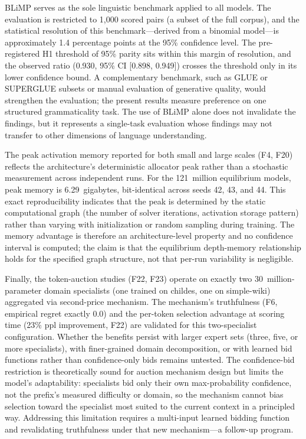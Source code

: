 BLiMP serves as the sole linguistic benchmark applied to all models. The evaluation is restricted to 1,000 scored pairs (a subset of the full corpus), and the statistical resolution of this benchmark—derived from a binomial model—is approximately 1.4 percentage points at the 95\% confidence level. The pre-registered H1 threshold of 95\% parity sits within this margin of resolution, and the observed ratio (0.930, 95\% CI [0.898, 0.949]) crosses the threshold only in its lower confidence bound. A complementary benchmark, such as GLUE or SUPERGLUE subsets or manual evaluation of generative quality, would strengthen the evaluation; the present results measure preference on one structured grammaticality task. The use of BLiMP alone does not invalidate the findings, but it represents a single-task evaluation whose findings may not transfer to other dimensions of language understanding.

The peak activation memory reported for both small and large scales (F4, F20) reflects the architecture's deterministic allocator peak rather than a stochastic measurement across independent runs. For the 121~million equilibrium models, peak memory is 6.29~gigabytes, bit-identical across seeds 42, 43, and 44. This exact reproducibility indicates that the peak is determined by the static computational graph (the number of solver iterations, activation storage pattern) rather than varying with initialization or random sampling during training. The memory advantage is therefore an architecture-level property and no confidence interval is computed; the claim is that the equilibrium depth-memory relationship holds for the specified graph structure, not that per-run variability is negligible.

Finally, the token-auction studies (F22, F23) operate on exactly two 30~million-parameter domain specialists (one trained on childes, one on simple-wiki) aggregated via second-price mechanism. The mechanism's truthfulness (F6, empirical regret exactly 0.0) and the per-token selection advantage at scoring time (23\% ppl improvement, F22) are validated for this two-specialist configuration. Whether the benefits persist with larger expert sets (three, five, or more specialists), with finer-grained domain decomposition, or with learned bid functions rather than confidence-only bids remains untested. The confidence-bid restriction is theoretically sound for auction mechanism design but limits the model's adaptability: specialists bid only their own max-probability confidence, not the prefix's measured difficulty or domain, so the mechanism cannot bias selection toward the specialist most suited to the current context in a principled way. Addressing this limitation requires a multi-input learned bidding function and revalidating truthfulness under that new mechanism—a follow-up program.


